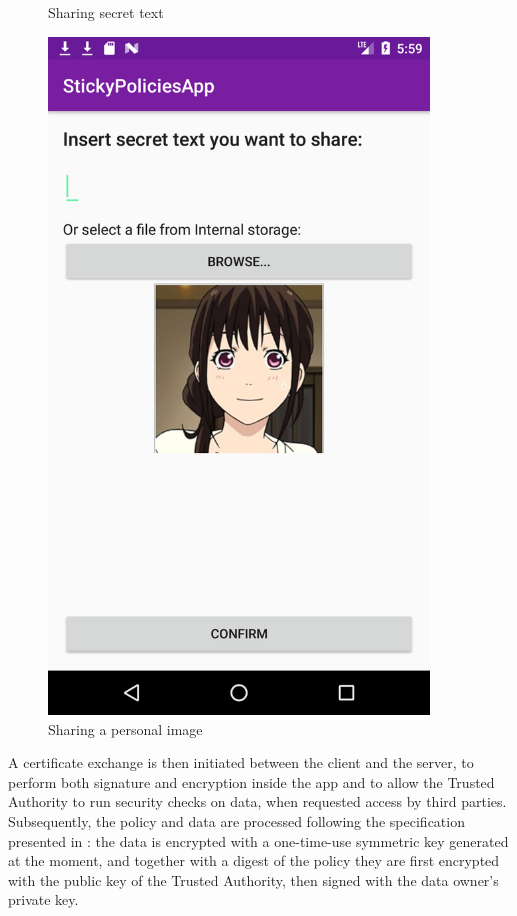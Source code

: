 \begin{figure}
\begin{minipage}{0.35\textwidth}
		\caption{Sharing secret text}
		\label{fig:share-text}
	\end{minipage}
	\begin{minipage}{0.35\textwidth}
		\centering
		\includegraphics[width=0.9\textwidth]{ShareData-image.png} %
		\caption{Sharing a personal image}
		\label{fig:share-img}
	\end{minipage}
\end{figure}

A certificate exchange is then initiated between the client and the server, to perform both signature and encryption inside the app and to allow the Trusted Authority to run security checks on data, when requested access by third parties. Subsequently, the policy and data are processed following the specification presented in \cite{pearson2011sticky}: the data is encrypted with a one-time-use symmetric key generated at the moment, and together with a digest of the policy they are first encrypted with the public key of the Trusted Authority, then signed with the data owner's private key.


